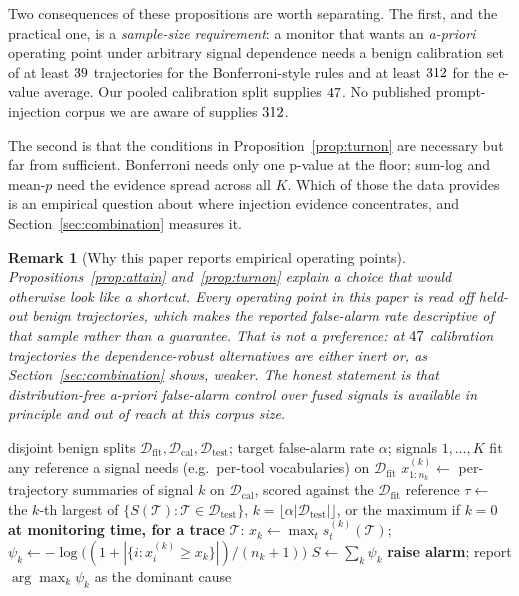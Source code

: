 \documentclass[pdflatex,sn-basic]{sn-jnl}%
\theoremstyle{thmstyleone}
\theoremstyle{thmstyletwo}
\newtheorem{remark}{Remark}
\theoremstyle{thmstylethree}
\newcommand{\Tcal}{\mathcal{T}}
\newcommand{\Dcal}{\mathcal{D}}
\begin{document}
Two consequences of these propositions are worth separating. The first, and the
practical one, is a \emph{sample-size requirement}: a monitor that wants an
\emph{a-priori} operating point under arbitrary signal dependence needs a benign
calibration set of at least $39$ trajectories for the Bonferroni-style
rules and at least $312$ for the e-value average. Our pooled calibration
split supplies $47$. No published prompt-injection corpus we are aware of
supplies $312$.

The second is that the conditions in Proposition~\ref{prop:turnon} are necessary
but far from sufficient. Bonferroni needs only one p-value at the floor;
sum-log and mean-$p$ need the evidence spread across all $K$. Which of those the
data provides is an empirical question about where injection evidence
concentrates, and Section~\ref{sec:combination} measures it.

\begin{remark}[Why this paper reports empirical operating points]
\label{rem:whyempirical}
Propositions~\ref{prop:attain} and~\ref{prop:turnon} explain a choice that would
otherwise look like a shortcut. Every operating point in this paper is read off
held-out benign trajectories, which makes the reported false-alarm rate
descriptive of that sample rather than a guarantee. That is not a preference: at
$47$ calibration trajectories the dependence-robust alternatives are
either inert or, as Section~\ref{sec:combination} shows, weaker. The honest
statement is that distribution-free \emph{a-priori} false-alarm control over fused
signals is available in principle and out of reach at this corpus size.
\end{remark}

\begin{algorithm}[t]
\caption{SENTRY-Fuse}\label{alg:fuse}
\begin{algorithmic}[1]
\Require disjoint benign splits $\Dcal_{\mathrm{fit}}, \Dcal_{\mathrm{cal}}, \Dcal_{\mathrm{test}}$; target false-alarm rate $\alpha$; signals $1,\dots,K$
\State fit any reference a signal needs (e.g.\ per-tool vocabularies) on $\Dcal_{\mathrm{fit}}$
  \State $x^{(k)}_{1:n_k} \gets$ per-trajectory summaries of signal $k$ on $\Dcal_{\mathrm{cal}}$, scored against the $\Dcal_{\mathrm{fit}}$ reference
\EndFor
\State $\tau \gets$ the $k$-th largest of $\{S(\Tcal) : \Tcal \in \Dcal_{\mathrm{test}}\}$, $k = \lfloor \alpha |\Dcal_{\mathrm{test}}| \rfloor$, or the maximum if $k=0$ 
\Statex \textbf{at monitoring time, for a trace} $\Tcal$:
  \State $x_k \gets \max_t s^{(k)}_t(\Tcal)$;\quad
         $\psi_k \gets -\log\big((1 + |\{i : x^{(k)}_i \ge x_k\}|)/(n_k+1)\big)$
\EndFor
\State $S \gets \sum_k \psi_k$
 \textbf{raise alarm}; report $\arg\max_k \psi_k$ as the dominant cause
\EndIf
\end{algorithmic}
\end{algorithm}
\end{document}
